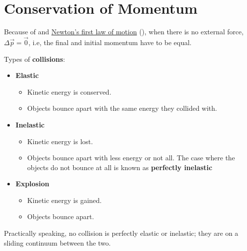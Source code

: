 \section{Conservation of Momentum}

Because of 
and \hyperref[itm:newtons-1st-law]{Newton's first law of motion}
(),
when there is no external force, \(\Delta{\vec{p}} = \vec{0}\),
i.e, the final and initial momentum have to be equal.

Types of \textbf{collisions}:
\begin{itemize}
    \item
        \textbf{Elastic}
        \begin{itemize}
            \item Kinetic energy is conserved.
            \item Objects bounce apart with the same energy they collided with.
        \end{itemize}
    \item
        \textbf{Inelastic}
        \begin{itemize}
            \item Kinetic energy is lost.
            \item Objects bounce apart with less energy or not all.
                The case where the objects do not bounce at all
                is known as \textbf{perfectly inelastic}
        \end{itemize}
    \item
        \textbf{Explosion}
        \begin{itemize}
            \item Kinetic energy is gained.
            \item Objects bounce apart.
        \end{itemize}
\end{itemize}

Practically speaking, no collision is perfectly elastic or inelastic;
they are on a sliding continuum between the two.

